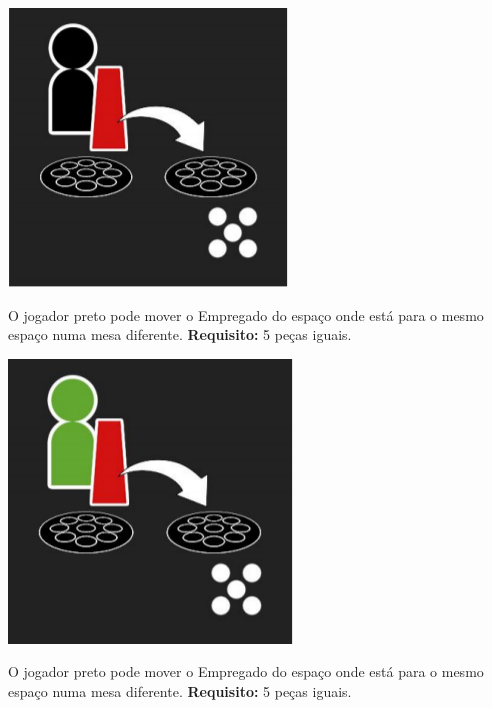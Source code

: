\documentclass[a4paper]{article}
\begin{document}
\begin{minipage}[t]{0.1\textwidth}
\includegraphics[scale=0.25]{black-waiter.png}
\end{minipage}
\begin{minipage}[t]{0.3\textwidth}
O jogador preto pode mover o Empregado do espaço onde está para o mesmo espaço numa mesa diferente. \textbf{Requisito:} 5 peças iguais.
\end{minipage}

\begin{minipage}[t]{0.1\textwidth}
\includegraphics[scale=0.25]{green-waiter.png}
\end{minipage}
\begin{minipage}[t]{0.3\textwidth}
O jogador preto pode mover o Empregado do espaço onde está para o mesmo espaço numa mesa diferente. \textbf{Requisito:} 5 peças iguais.
\end{minipage}
\end{document}

